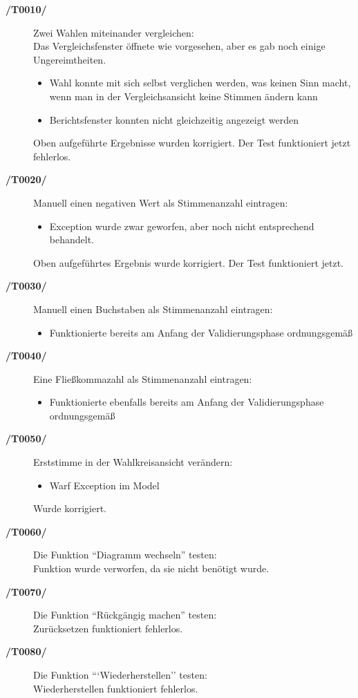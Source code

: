 \documentclass[12pt,a4paper,titlepage]{article}
\begin{document}
\begin{description}
	\item[\textbf{/T0010/}] Zwei Wahlen miteinander vergleichen: \\
	Das Vergleichsfenster öffnete wie vorgesehen, aber es gab noch einige Ungereimtheiten.
	\begin{itemize}
	\item Wahl konnte mit sich selbst verglichen werden, was keinen Sinn macht, wenn man in der Vergleichsansicht keine Stimmen ändern kann
	\item Berichtsfenster konnten nicht gleichzeitig angezeigt werden
	\end{itemize}
	
	Oben aufgeführte Ergebnisse wurden korrigiert. Der Test funktioniert jetzt fehlerlos.
	\item[\textbf{/T0020/}] Manuell einen negativen Wert als Stimmenanzahl eintragen: \\
	\begin{itemize}
	\item Exception wurde zwar geworfen, aber noch nicht entsprechend behandelt.
	\end{itemize}
	
	Oben aufgeführtes Ergebnis wurde korrigiert. Der Test funktioniert jetzt.
	\item[\textbf{/T0030/}] Manuell einen Buchstaben als Stimmenanzahl eintragen: \\
	\begin{itemize}
	\item Funktionierte bereits am Anfang der Validierungsphase ordnungsgemäß
	\end{itemize}
	
	\item[\textbf{/T0040/}] Eine Fließkommazahl als Stimmenanzahl eintragen: \\
	\begin{itemize}
	\item Funktionierte ebenfalls bereits am Anfang der Validierungsphase ordnungsgemäß
	\end{itemize}
	\newpage
	
	\item[\textbf{/T0050/}] Erststimme in der Wahlkreisansicht verändern: \\
	\begin{itemize}
	\item Warf Exception im Model
	\end{itemize}
	Wurde korrigiert.
	\item[\textbf{/T0060/}] Die Funktion ``Diagramm wechseln'' testen:\\
	Funktion wurde verworfen, da sie nicht benötigt wurde.
	
	\item[\textbf{/T0070/}] Die Funktion ``Rückgängig machen'' testen: \\
	Zurücksetzen funktioniert fehlerlos.
	\item[\textbf{/T0080/}] Die Funktion ```Wiederherstellen'' testen: \\
	Wiederherstellen funktioniert fehlerlos.
	

\end{description}
\end{document}
